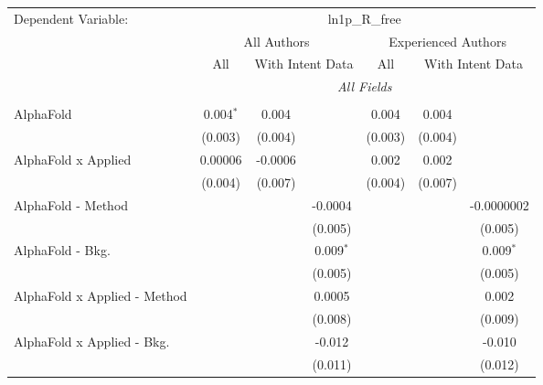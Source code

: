 \begingroup
\centering
\begin{tabular}{lcccccc}
   \tabularnewline \midrule \midrule
   Dependent Variable: & \multicolumn{6}{c}{ln1p\_R\_free}\\
 & \multicolumn{3}{c}{All Authors} & \multicolumn{3}{c}{Experienced Authors} \\
\cmidrule(lr){2-4} \cmidrule(lr){5-7}
 & \multicolumn{1}{c}{All} & \multicolumn{2}{c}{With Intent Data} & \multicolumn{1}{c}{All} & \multicolumn{2}{c}{With Intent Data} \\
\cmidrule(lr){2-2} \cmidrule(lr){3-4} \cmidrule(lr){5-5} \cmidrule(lr){6-7}
 & \multicolumn{6}{c}{\textit{All Fields}} \\ \\
   AlphaFold                      & 0.004$^{*}$   & 0.004   &               & 0.004        & 0.004   &   \\   
                                  & (0.003)       & (0.004) &               & (0.003)      & (0.004) &   \\   
   AlphaFold x Applied            & 0.00006       & -0.0006 &               & 0.002        & 0.002   &   \\   
                                  & (0.004)       & (0.007) &               & (0.004)      & (0.007) &   \\   
   AlphaFold - Method             &               &         & -0.0004       &              &         & -0.0000002\\   
                                  &               &         & (0.005)       &              &         & (0.005)\\   
   AlphaFold - Bkg.               &               &         & 0.009$^{*}$   &              &         & 0.009$^{*}$\\   
                                  &               &         & (0.005)       &              &         & (0.005)\\   
   AlphaFold x Applied - Method   &               &         & 0.0005        &              &         & 0.002\\   
                                  &               &         & (0.008)       &              &         & (0.009)\\   
   AlphaFold x Applied - Bkg.     &               &         & -0.012        &              &         & -0.010\\   
                                  &               &         & (0.011)       &              &         & (0.012)\\   

\end{tabular}
